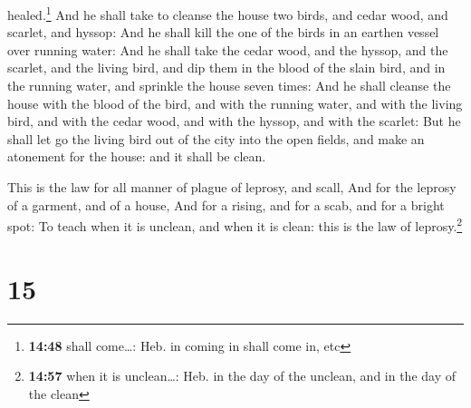 healed.\footnote{\textbf{14:48} shall come\ldots: Heb. in coming in
  shall come in, etc}  And he shall take to cleanse the
house two birds, and cedar wood, and scarlet, and hyssop:
 And he shall kill the one of the birds in an earthen
vessel over running water:  And he shall take the cedar
wood, and the hyssop, and the scarlet, and the living bird, and dip them
in the blood of the slain bird, and in the running water, and sprinkle
the house seven times:  And he shall cleanse the house
with the blood of the bird, and with the running water, and with the
living bird, and with the cedar wood, and with the hyssop, and with the
scarlet:  But he shall let go the living bird out of the
city into the open fields, and make an atonement for the house: and it
shall be clean.

 This is the law for all manner of plague of leprosy, and
scall,  And for the leprosy of a garment, and of a house,
 And for a rising, and for a scab, and for a bright spot:
 To teach when it is unclean, and when it is clean: this
is the law of leprosy.\footnote{\textbf{14:57} when it is unclean\ldots:
  Heb. in the day of the unclean, and in the day of the clean}

\hypertarget{section-14}{%
\section{15}\label{section-14}}

